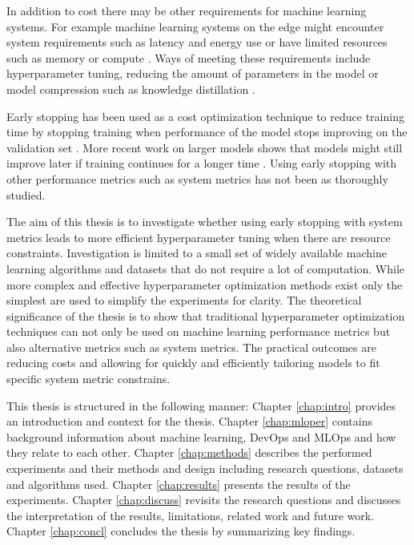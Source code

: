 In addition to cost there may be other requirements for machine learning systems. For example machine learning systems on the edge might encounter system requirements such as latency and energy use or have limited resources such as memory or compute \parencite{chenDeepLearningEdge2019}. Ways of meeting these requirements include hyperparameter tuning, reducing the amount of parameters in the model or model compression such as knowledge distillation \parencite{chenDeepLearningEdge2019}.

Early stopping has been used as a cost optimization technique to reduce training time by stopping training when performance of the model stops improving on the validation set \parencite{precheltAutomaticEarlyStopping1998}. More recent work on larger models shows that models might still improve later if training continues for a longer time \parencite{hofferTrainLongerGeneralize2018}. Using early stopping with other performance metrics such as system metrics has not been as thoroughly studied.


The aim of this thesis is to investigate whether using early stopping with system metrics leads to more efficient hyperparameter tuning when there are resource constraints. Investigation is limited to a small set of widely available machine learning algorithms and datasets that do not require a lot of computation. While more complex and effective hyperparameter optimization methods exist only the simplest are used to simplify the experiments for clarity. The theoretical significance of the thesis is to show that traditional hyperparameter optimization techniques can not only be used on machine learning performance metrics but also alternative metrics such as system metrics. The practical outcomes are reducing costs and allowing for quickly and efficiently tailoring models to fit specific system metric constrains.

This thesis is structured in the following manner: Chapter \ref{chap:intro} provides an introduction and context for the thesis. Chapter \ref{chap:mloper} contains background information about machine learning, DevOps and MLOps and how they relate to each other. Chapter \ref{chap:methods} describes the performed experiments and their methods and design including research questions, datasets and algorithms used. Chapter \ref{chap:results} presents the results of the experiments. Chapter \ref{chap:discuss} revisits the research questions and discusses the interpretation of the results, limitations, related work and future work. Chapter \ref{chap:concl} concludes the thesis by summarizing key findings.